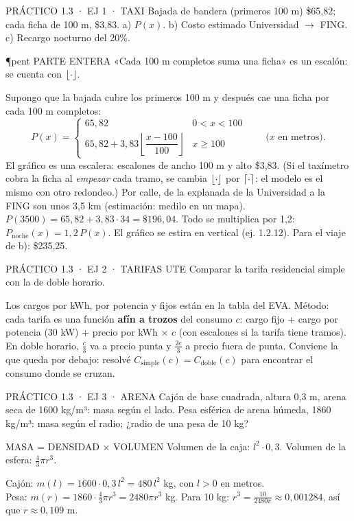 \begin{enunciado}{PRÁCTICO 1.3 · EJ 1 · TAXI}
Bajada de bandera (primeros 100 m) \$65,82; cada ficha de 100 m, \$3,83. a) $P(x)$. b) Costo estimado Universidad $\to$ FING. c) Recargo nocturno del 20\%.
\end{enunciado}
\begin{uso}{\P{pent} PARTE ENTERA}
«Cada 100 m completos suma una ficha» es un escalón: se cuenta con $\lfloor \cdot\rfloor$.
\end{uso}
Supongo que la bajada cubre los primeros 100 m y después cae una ficha por cada 100 m completos:
\[P(x)=\begin{cases}65{,}82 & 0<x<100\\[2pt] 65{,}82+3{,}83\left\lfloor\dfrac{x-100}{100}\right\rfloor & x\ge100\end{cases}\qquad\text{($x$ en metros).}\]
El gráfico es una escalera: escalones de ancho 100 m y alto \$3,83. (Si el taxímetro cobra la ficha al \emph{empezar} cada tramo, se cambia $\lfloor \cdot\rfloor$ por $\lceil \cdot\rceil$: el modelo es el mismo con otro redondeo.)
Por calle, de la explanada de la Universidad a la FING son unos 3,5 km (estimación: medilo en un mapa). $P(3500)=65{,}82+3{,}83\cdot34=\$196{,}04$.
Todo se multiplica por 1,2: $P_{\text{noche}}(x)=1{,}2\,P(x)$. El gráfico se estira en vertical (ej. 1.2.12). Para el viaje de b): \$235,25.

\begin{enunciado}{PRÁCTICO 1.3 · EJ 2 · TARIFAS UTE}
Comparar la tarifa residencial simple con la de doble horario.
\end{enunciado}
\begin{falta}
Los cargos por kWh, por potencia y fijos están en la tabla del EVA. Método: cada tarifa es una función \textbf{afín a trozos} del consumo $c$: cargo fijo + cargo por potencia (30 kW) + precio por kWh × $c$ (con escalones si la tarifa tiene tramos). En doble horario, $\frac c3$ va a precio punta y $\frac{2c}3$ a precio fuera de punta. Conviene la que queda por debajo: resolvé $C_{\text{simple}}(c)=C_{\text{doble}}(c)$ para encontrar el consumo donde se cruzan.
\end{falta}

\begin{enunciado}{PRÁCTICO 1.3 · EJ 3 · ARENA}
Cajón de base cuadrada, altura 0,3 m, arena seca de 1600 kg/m³: masa según el lado. Pesa esférica de arena húmeda, 1860 kg/m³: masa según el radio; ¿radio de una pesa de 10 kg?
\end{enunciado}
\begin{uso}{MASA = DENSIDAD × VOLUMEN}
Volumen de la caja: $l^2\cdot0{,}3$. Volumen de la esfera: $\frac43\pi r^3$.
\end{uso}
Cajón: $m(l)=1600\cdot0{,}3\,l^2=480\,l^2$ kg, con $l>0$ en metros.\\
Pesa: $m(r)=1860\cdot\frac43\pi r^3=2480\pi r^3$ kg. Para 10 kg: $r^3=\frac{10}{2480\pi}\approx0{,}001284$, así que $r\approx0{,}109$ m.

